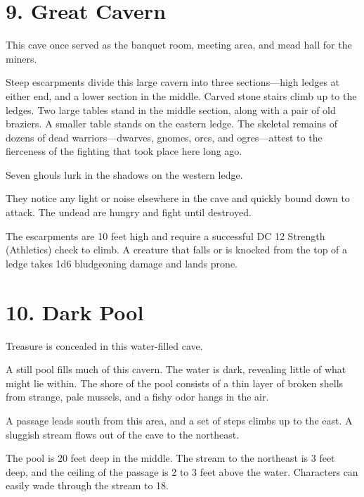 \documentclass[10pt,a4paper,twoside,bg=print,twocolumn,openany,nodeprecatedcode]{dndbook}
\begin{document}
\section{9. Great Cavern}
This cave once served as the banquet room, meeting area, and mead hall for the miners.

\begin{DndReadAloud}{}
Steep escarpments divide this large cavern into three sections—high ledges at either end, and a lower section in the middle. Carved stone stairs climb up to the ledges. Two large tables stand in the middle section, along with a pair of old braziers. A smaller table stands on the eastern ledge. The skeletal remains of dozens of dead warriors—dwarves, gnomes, orcs, and ogres—attest to the fierceness of the fighting that took place here long ago.

\end{DndReadAloud}

Seven ghouls lurk in the shadows on the western ledge.

They notice any light or noise elsewhere in the cave and quickly bound down to attack. The undead are hungry and fight until destroyed.

The escarpments are 10 feet high and require a successful DC 12 Strength (Athletics) check to climb. A creature that falls or is knocked from the top of a ledge takes 1d6 bludgeoning damage and lands prone.

\section{10. Dark Pool}
Treasure is concealed in this water-filled cave.

\begin{DndReadAloud}{}
A still pool fills much of this cavern. The water is dark, revealing little of what might lie within. The shore of the pool consists of a thin layer of broken shells from strange, pale mussels, and a fishy odor hangs in the air.

A passage leads south from this area, and a set of steps climbs up to the east. A sluggish stream flows out of the cave to the northeast.

\end{DndReadAloud}

The pool is 20 feet deep in the middle. The stream to the northeast is 3 feet deep, and the ceiling of the passage is 2 to 3 feet above the water. Characters can easily wade through the stream to 18.
\end{document}
